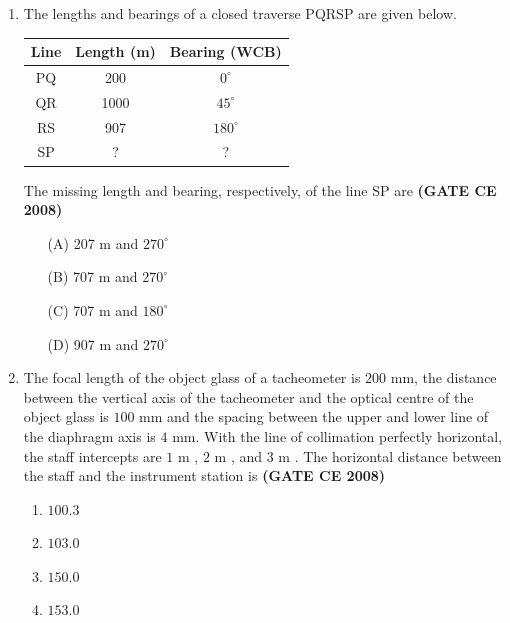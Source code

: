 \documentclass[journal]{IEEEtran}
\begin{document}
\begin{enumerate}
\item The lengths and bearings of a closed traverse PQRSP are given below.

\vspace{0.3cm}

\begin{tabular}{|c|c|c|}
\hline
\textbf{Line} & \textbf{Length (m)} & \textbf{Bearing (WCB)} \\
\hline
PQ & 200 & $0^\circ$ \\
QR & 1000 & $45^\circ$ \\
RS & 907 & $180^\circ$ \\
SP & ? & ? \\
\hline
\end{tabular}

\vspace{0.5cm}

The missing length and bearing, respectively, of the line SP are \textbf{(GATE CE 2008)}

\begin{itemize}
\item[(A)] 207 m and $270^\circ$
\item[(B)] 707 m and $270^\circ$
\item[(C)] 707 m and $180^\circ$
\item[(D)] 907 m and $270^\circ$
\end{itemize}

\item The focal length of the object glass of a tacheometer is $200$ mm, the distance between the vertical axis of the tacheometer and the optical centre of the object glass is $100$ mm and the spacing between the upper and lower line of the diaphragm axis is $4$ mm. With the line of collimation perfectly horizontal, the staff intercepts are $1$ m , $2$ m , and $3$ m . The horizontal distance  between the staff and the instrument station is \textbf{(GATE CE 2008)}
\begin{multicols}{2}
\begin{enumerate}
\item $100.3$ 
\item $103.0$ 
\item $150.0$ 
\item $153.0$ 
\end{enumerate}  
\end{multicols}


\end{enumerate}
\end{document}

